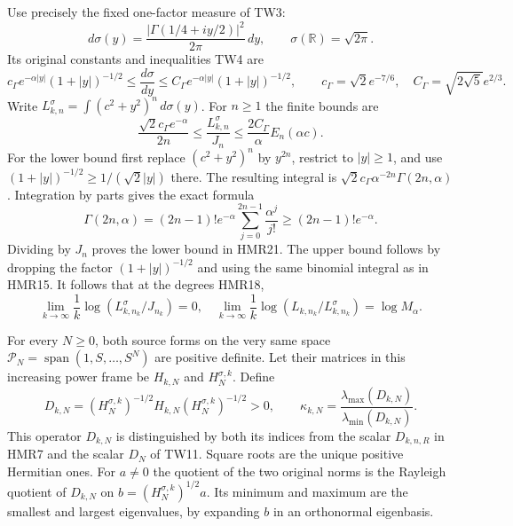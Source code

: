 \documentclass[11pt,a4paper]{article}
\begin{document}
Use precisely the fixed one-factor measure of TW3:
\[
 d\sigma(y)=\frac{|\Gamma(1/4+iy/2)|^2}{2\pi}\,dy,\qquad
 \sigma(\mathbb R)=\sqrt{2\pi}.
 \tag{HMR19}
\]
Its original constants and inequalities TW4 are
\[
 c_\Gamma e^{-\alpha|y|}(1+|y|)^{-1/2}
 \leq\frac{d\sigma}{dy}
 \leq C_\Gamma e^{-\alpha|y|}(1+|y|)^{-1/2},\qquad
 c_\Gamma=\sqrt2e^{-7/6},\quad
 C_\Gamma=\sqrt{2\sqrt5}e^{2/3}.
 \tag{HMR20}
\]
Write $L^\sigma_{k,n}=\int(c^2+y^2)^n\,d\sigma(y)$.
For $n\geq1$ the finite bounds are
\[
 \frac{\sqrt2c_\Gamma e^{-\alpha}}{2n}
 \leq\frac{L^\sigma_{k,n}}{J_n}
 \leq\frac{2C_\Gamma}{\alpha}E_n(\alpha c).
 \tag{HMR21}
\]
For the lower bound first replace $(c^2+y^2)^n$ by
$y^{2n}$, restrict to $|y|\geq1$, and use
$(1+|y|)^{-1/2}\geq1/(\sqrt2|y|)$ there.
The resulting integral is
$\sqrt2c_\Gamma\alpha^{-2n}\Gamma(2n,\alpha)$.
Integration by parts gives the exact formula
\[
 \Gamma(2n,\alpha)=(2n-1)!e^{-\alpha}
              \sum_{j=0}^{2n-1}\frac{\alpha^j}{j!}
 \geq(2n-1)!e^{-\alpha}.
\]
Dividing by $J_n$ proves the lower bound in HMR21.
The upper bound follows by dropping the factor
$(1+|y|)^{-1/2}$ and using the same binomial integral
as in HMR15. It follows that at the degrees HMR18,
\[
 \lim_{k\to\infty}\frac1k\log(L^\sigma_{k,n_k}/J_{n_k})=0,
 \quad
 \lim_{k\to\infty}\frac1k\log(L_{k,n_k}/L^\sigma_{k,n_k})
 =\log M_\alpha .
 \tag{HMR22}
\]

For every $N\geq0$, both source forms on the very same
space $\mathcal P_N=\operatorname{span}(1,S,\ldots,S^N)$
are positive definite. Let their matrices in this increasing
power frame be $H_{k,N}$ and $H^{\sigma,k}_N$. Define
\[
 D_{k,N}=(H^{\sigma,k}_N)^{-1/2}
              H_{k,N}(H^{\sigma,k}_N)^{-1/2}>0,\qquad
 \kappa_{k,N}=
       \frac{\lambda_{\max}(D_{k,N})}{\lambda_{\min}(D_{k,N})}.
 \tag{HMR23}
\]
This operator $D_{k,N}$ is distinguished by both its indices
from the scalar $D_{k,n,R}$ in HMR7 and the scalar $D_N$ of
TW11. Square roots are the unique positive Hermitian ones.
For $a\ne0$ the quotient of the two original norms is the
Rayleigh quotient of $D_{k,N}$ on
$b=(H^{\sigma,k}_N)^{1/2}a$. Its minimum and maximum
are the smallest and largest eigenvalues, by expanding
$b$ in an orthonormal eigenbasis.
\end{document}
